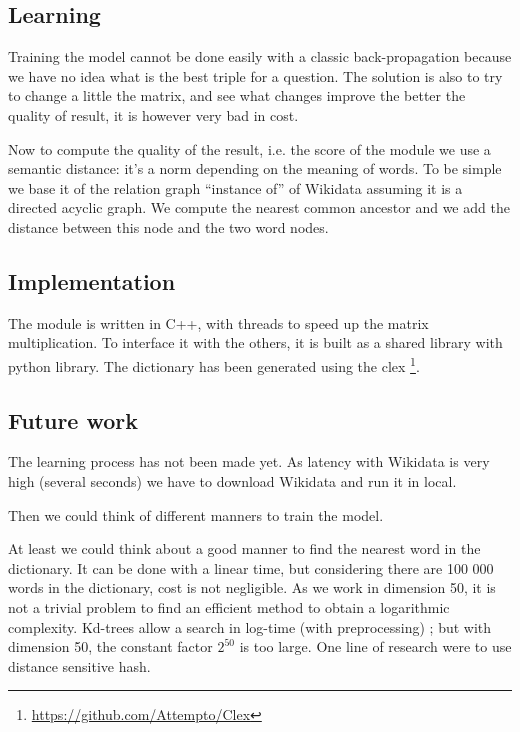 \subsection{Learning}

Training the model cannot be done easily with a classic back-propagation because we have no idea what is the best triple for a question. The solution is also to try to change a little the matrix, and see what changes improve the better the quality of result, it is however very bad in cost. 

Now to compute the quality of the result, i.e. the score  of the module we use a semantic distance: it's a norm depending on the meaning of words. To be simple we base it of the relation graph ``instance of'' of Wikidata assuming it is a directed acyclic graph. We compute the nearest common ancestor and we add the distance between this node and the two word  nodes.

\subsection{Implementation}

The module is written in C++, with threads to speed up the matrix multiplication. To interface it with the others, it is built as a shared library with python library. The dictionary has been generated using the clex \footnote{\url{https://github.com/Attempto/Clex}}. 

\subsection{Future work}

The learning process has not been made yet. As latency with Wikidata is very high (several seconds) we have to download Wikidata and run it in local.

Then we could think of different manners to train the model.

At least we could think about a good manner to find the nearest word in the dictionary. It can be done with a linear time, but considering there are 100 000 words in the dictionary, cost is not negligible. As we work in dimension 50, it is not a trivial problem to find an efficient method to obtain a logarithmic complexity. Kd-trees allow a search in log-time (with preprocessing) ; but with dimension 50, the constant factor $2^{50}$ is too large. One line of research were to use distance sensitive hash.


